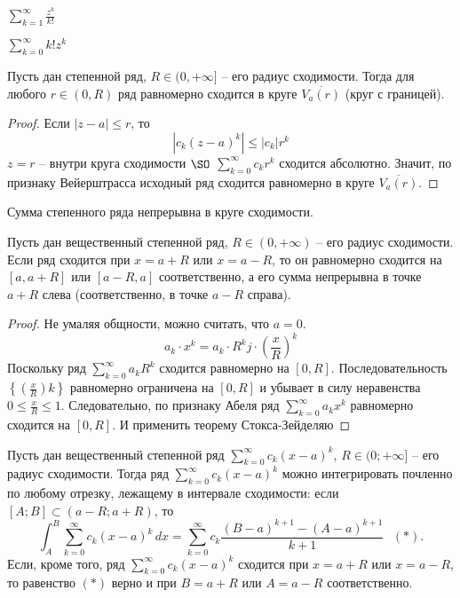 \begin{Ex}
	$\sum_{k=1}^{\infty} \frac{z^k}{k!}$ 
\end{Ex}

\begin{Ex}
	$\sum_{k=0}^{\infty} k! z^k$ 
\end{Ex}

\begin{Thm}
	Пусть дан степенной ряд, $R \in (0, +\infty]$ -- его радиус сходимости. 
	Тогда для любого $r \in (0, R)$ ряд равномерно сходится в круге $\overline{V_a(r)}$ (круг с границей).
\end{Thm}

\begin{proof}
	Если $|z - a| \leqslant r$, то
	\[|c_k (z - a)^k| \leqslant |c_k| r^k\]	
	$z = r$ -- внутри круга сходимости $\SO$ $\sum_{k=0}^{\infty} c_k r^k$ сходится абсолютно.
	Значит, по признаку Вейерштрасса исходный ряд сходится равномерно в круге $\overline{V_a(r)}$.  
\end{proof}

\begin{Cons}
	Сумма степенного ряда непрерывна в круге сходимости.
\end{Cons}

\begin{Thm}
	Пусть дан вещественный степенной ряд, $R \in (0, +\infty)$ -- его радиус сходимости.
	Если ряд сходится при $x = a + R$ или $x = a - R$, то он равномерно сходится на $[a, a + R]$ или $[a - R, a]$ соответственно,
	а его сумма непрерывна в точке $a + R$ слева (соответственно, в точке $a - R$ справа).  
\end{Thm}

\begin{proof}
	Не умаляя общности, можно считать, что $a = 0$.
	\[a_k \cdot x^k = a_k \cdot R^kj \cdot \left(\frac{x}{R}\right)^k\]
	Поскольку ряд $\sum_{k=0}^{\infty} a_k R^k$ сходится равномерно на $[0, R]$. Последовательность $\left\{\left(\frac{x}{R}\right)k\right\}$ равномерно ограничена на $[0, R]$ и убывает в силу неравенства $0 \leqslant \frac{x}{R} \leqslant 1$.
	Следовательно, по признаку Абеля ряд $\sum_{k=0}^{\infty} a_k x^k$ равномерно сходится на $[0, R]$. И применить теорему Стокса-Зейделяю  
\end{proof}

\begin{Cons}
	Пусть дан вещественный степенной ряд $\displaystyle \sum_{k = 0}^{\infty} c_k (x-a)^k$, $R \in (0; + \infty]$ -- его радиус сходимости. Тогда ряд $\displaystyle \sum_{k = 0}^{\infty} c_k (x-a)^k$ можно интегрировать почленно по любому отрезку, лежащему в интервале сходимости: если $[A; B] \subset (a - R; a+ R)$, то 
	\[ \int_{A}^{B} \sum_{k = 0}^{\infty} c_k (x - a)^k \,dx  = \sum_{k = 0}^{\infty} c_k \frac{(B - a)^{k + 1} - (A - a)^{k + 1}}{k + 1} \ \ \ (*).\]
	Если, кроме того, ряд $\displaystyle \sum_{k = 0}^{\infty} c_k (x-a)^k$ сходится при $x = a + R$ или $x = a - R$, то равенство $(*)$ верно и при $B = a  + R$ или $A = a - R$ соответственно.
\end{Cons}

